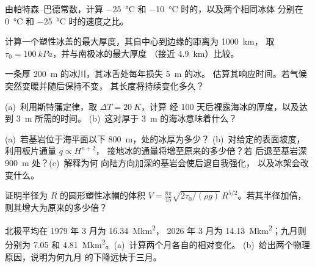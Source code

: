 \begin{exercise}[$\star\star$]\label{exo:b3:glaciology:6}
由帕特森–巴德常数，计算
\qty{-25}{\celsius} 和 \qty{-10}{\celsius} 时的，以及两个相同冰体
分别在 \qty{0}{\celsius} 和 \qty{-25}{\celsius} 时的速度之比。
\end{exercise}

\begin{exercise}[$\star\star$]\label{exo:b3:glaciology:7}
计算一个塑性冰盖的最大厚度，其自中心到边缘的距离为 \qty{1000}{km}，
取 $\tau_0 = \qty{100}{kPa}$，并与南极冰的最大厚度
（接近 \qty{4.9}{km}）比较。
\end{exercise}

\begin{exercise}[$\star\star$]\label{exo:b3:glaciology:8}
一条厚 \qty{200}{m} 的冰川，其冰舌处每年损失 \qty{5}{m} 的冰。
估算其响应时间。若气候突然变暖并随后保持不变，
其长度将持续变化多久？
\end{exercise}

\begin{exercise}[$\star\star$]\label{exo:b3:glaciology:9}
(a)~利用斯特藩定律，取 $\Delta T = \qty{20}{K}$，计算
经 100 天后裸露海冰的厚度，以及达到 \qty{3}{m} 所需的时间。
(b)~这对厚于 \qty{3}{m} 的海冰意味着什么？
\end{exercise}

\begin{exercise}[$\star\star\star$]\label{exo:b3:glaciology:10}
(a)~若基岩位于海平面以下 \qty{800}{m}，处的冰厚为多少？
(b)~对给定的表面坡度，利用板片通量 $q \propto H^{n+2}$，
接地冰的通量将增至原来的多少倍？若
后退至基岩深 \qty{900}{m} 处？(c)~解释为何
向陆方向加深的基岩会使后退自我强化，
以及冰架会改变什么。
\end{exercise}

\begin{exercise}[$\star\star\star$]\label{exo:b3:glaciology:11}
证明半径为 $R$ 的圆形塑性冰帽的体积 $V =
\frac{8\pi}{15}\sqrt{2\tau_0/(\rho g)}\,R^{5/2}$。若其半径加倍，
则其增大为原来的多少倍？
\end{exercise}

\begin{exercise}[$\star\star\star$]\label{exo:b3:glaciology:12}
北极平均在 1979 年 3 月为 \qty{16.34}{\mega km^2}，
2026 年 3 月为 \qty{14.13}{\mega km^2}；九月则分别为 \num{7.05} 和
\qty{4.81}{\mega km^2}。(a)~计算两个月各自的相对变化。
(b)~给出两个物理原因，说明为何九月
的下降远快于三月。
\end{exercise}

